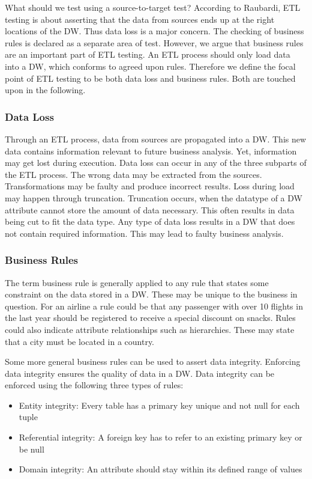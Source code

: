What should we test using a source-to-target test? According to Raubardi, ETL testing is about asserting that the data from sources ends up at the right locations of the DW. Thus data loss is a major concern. The checking of business rules is declared as a separate area of test. However, we argue that business rules are an important part of ETL testing. An ETL process should only load data into a DW, which conforms to agreed upon rules. Therefore we define the focal point of ETL testing to be both data loss and business rules. Both are touched upon in the following.

\subsubsection{Data Loss}
Through an ETL process, data from sources are propagated into a DW. This new data contains information relevant to future business analysis. Yet, information may get lost during execution. Data loss can occur in any of the three subparts of the ETL process. The wrong data may be extracted from the sources. Transformations may be faulty and produce incorrect results. Loss during load may happen through truncation. Truncation occurs, when the datatype of a DW attribute cannot store the amount of data necessary. This often results in data being cut to fit the data type. Any type of data loss results in a DW that does not contain required information. This may lead to faulty business analysis.

\subsubsection{Business Rules}
The term business rule is generally applied to any rule that states some constraint on the data stored in a DW. These may be unique to the business in question. For an airline a rule could be  that any passenger with over 10 flights in the last year should be registered to receive a special discount on snacks. Rules could also indicate attribute relationships such as hierarchies. These may state that a city must be located in a country. 

Some more general business rules can be used to assert data integrity. Enforcing data integrity ensures the quality of data in a DW. Data integrity can be enforced using the following three types of rules:

\begin{itemize}
\item Entity integrity: Every table has a primary key unique and not null for each tuple
\item Referential integrity: A foreign key has to refer to an existing primary key or be null
\item Domain integrity: An attribute should stay within its defined range of values
\end{itemize}

